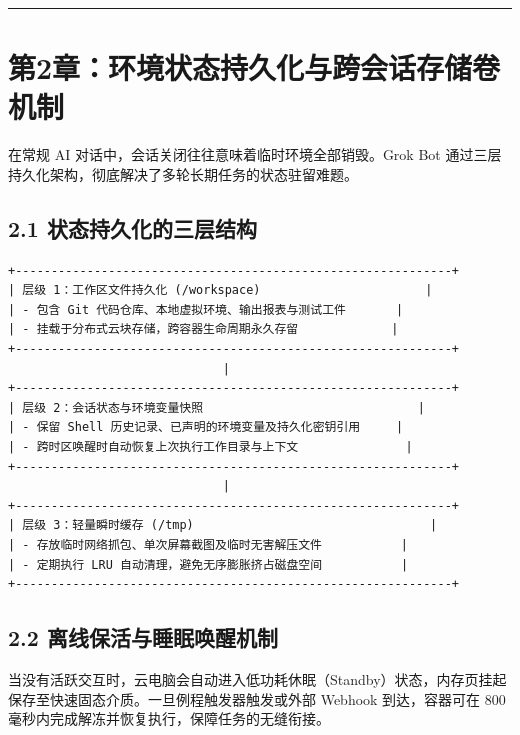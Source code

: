 \documentclass[10.5pt,a4paper,oneside]{report}
\begin{document}
\begin{center}\rule{0.5\linewidth}{0.5pt}\end{center}

\section{第2章：环境状态持久化与跨会话存储卷机制}\label{ux7b2c2ux7ae0ux73afux5883ux72b6ux6001ux6301ux4e45ux5316ux4e0eux8de8ux4f1aux8bddux5b58ux50a8ux5377ux673aux5236}

在常规 AI 对话中，会话关闭往往意味着临时环境全部销毁。Grok Bot
通过三层持久化架构，彻底解决了多轮长期任务的状态驻留难题。

\subsection{2.1
状态持久化的三层结构}\label{ux72b6ux6001ux6301ux4e45ux5316ux7684ux4e09ux5c42ux7ed3ux6784}

\begin{lstlisting}
+-------------------------------------------------------------+
| 层级 1：工作区文件持久化 (/workspace)                       |
| - 包含 Git 代码仓库、本地虚拟环境、输出报表与测试工件       |
| - 挂载于分布式云块存储，跨容器生命周期永久存留             |
+-------------------------------------------------------------+
                              |
+-------------------------------------------------------------+
| 层级 2：会话状态与环境变量快照                              |
| - 保留 Shell 历史记录、已声明的环境变量及持久化密钥引用     |
| - 跨时区唤醒时自动恢复上次执行工作目录与上下文               |
+-------------------------------------------------------------+
                              |
+-------------------------------------------------------------+
| 层级 3：轻量瞬时缓存 (/tmp)                                 |
| - 存放临时网络抓包、单次屏幕截图及临时无害解压文件           |
| - 定期执行 LRU 自动清理，避免无序膨胀挤占磁盘空间           |
+-------------------------------------------------------------+
\end{lstlisting}

\subsection{2.2
离线保活与睡眠唤醒机制}\label{ux79bbux7ebfux4fddux6d3bux4e0eux7761ux7720ux5524ux9192ux673aux5236}

当没有活跃交互时，云电脑会自动进入低功耗休眠（Standby）状态，内存页挂起保存至快速固态介质。一旦例程触发器触发或外部
Webhook 到达，容器可在 800
毫秒内完成解冻并恢复执行，保障任务的无缝衔接。
\end{document}
